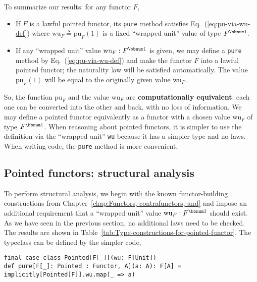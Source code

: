 To summarize our results: for any functor $F$,
\begin{itemize}
\item If $F$ is a lawful pointed functor, its \lstinline!pure! method
satisfies Eq.~(\ref{eq:pu-via-wu-def}) where $\text{wu}_{F}\triangleq\text{pu}_{F}(1)$
is a fixed ``wrapped unit'' value of type $F^{\bbnum 1}$.
\item If any ``wrapped unit'' value $\text{wu}_{F}:F^{\bbnum 1}$ is given,
we may define a \lstinline!pure! method by Eq.~(\ref{eq:pu-via-wu-def})
and make the functor $F$ into a lawful pointed functor; the naturality
law will be satisfied automatically. The value $\text{pu}_{F}(1)$
will be equal to the originally given value $\text{wu}_{F}$.
\end{itemize}
So, the function $\text{pu}_{F}$ and the value $\text{wu}_{F}$ are
\textbf{computationally equivalent}:
each one can be converted into the other and back, with no loss of
information. We may define a pointed functor equivalently as a functor
with a chosen value $\text{wu}_{F}$ of type $F^{\bbnum 1}$. When
reasoning about pointed functors, it is simpler to use the definition
via the ``wrapped unit'' \lstinline!wu! because it has a simpler
type and no laws. When writing code, the \lstinline!pure! method
is more convenient.

\subsection{Pointed functors: structural analysis\label{subsec:Pointed-functors:-structural-analysis}}

To perform structural analysis, we begin with the known functor-building
constructions from Chapter~\ref{chap:Functors,-contrafunctors,-and}
and impose an additional requirement that a ``wrapped unit'' value
$\text{wu}_{F}:F^{\bbnum 1}$ should exist. As we have seen in the
previous section, no additional laws need to be checked. The results
are shown in Table~\ref{tab:Type-constructions-for-pointed-functor}.
The typeclass can be defined by the simpler code,
\begin{lstlisting}
final case class Pointed[F[_]](wu: F[Unit])
def pure[F[_]: Pointed : Functor, A](a: A): F[A] = implicitly[Pointed[F]].wu.map(_ => a)
\end{lstlisting}

